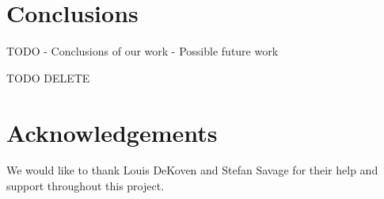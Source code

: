 \documentclass[letterpaper,twocolumn,10pt]{article}
\begin{document}
\section{Conclusions}
TODO
- Conclusions of our work
- Possible future work

TODO DELETE~\cite{ipv4sta}

\section*{Acknowledgements}
We would like to thank Louis DeKoven and Stefan Savage for their help and support throughout this project.

{\footnotesize 
}

\theendnotes
\end{document}
